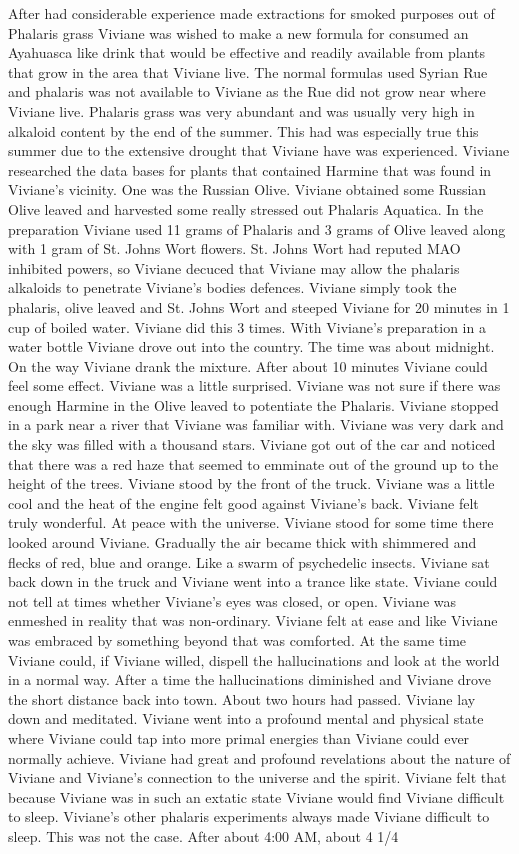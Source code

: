 \documentclass[12pt]{book}
\begin{document}
After had considerable experience made extractions for smoked purposes out of Phalaris grass Viviane was wished to make a new formula for consumed an Ayahuasca like drink that would be effective and readily available from plants that grow in the area that Viviane live. The normal formulas used Syrian Rue and phalaris was not available to Viviane as the Rue did not grow near where Viviane live. Phalaris grass was very abundant and was usually very high in alkaloid content by the end of the summer. This had was especially true this summer due to the extensive drought that Viviane have was experienced. Viviane researched the data bases for plants that contained Harmine that was found in Viviane's vicinity. One was the Russian Olive. Viviane obtained some Russian Olive leaved and harvested some really stressed out Phalaris Aquatica. In the preparation Viviane used 11 grams of Phalaris and 3 grams of Olive leaved along with 1 gram of St. Johns Wort flowers. St. Johns Wort had reputed MAO inhibited powers, so Viviane decuced that Viviane may allow the phalaris alkaloids to penetrate Viviane's bodies defences. Viviane simply took the phalaris, olive leaved and St. Johns Wort and steeped Viviane for 20 minutes in 1 cup of boiled water. Viviane did this 3 times. With Viviane's preparation in a water bottle Viviane drove out into the country. The time was about midnight. On the way Viviane drank the mixture. After about 10 minutes Viviane could feel some effect. Viviane was a little surprised. Viviane was not sure if there was enough Harmine in the Olive leaved to potentiate the Phalaris. Viviane stopped in a park near a river that Viviane was familiar with. Viviane was very dark and the sky was filled with a thousand stars. Viviane got out of the car and noticed that there was a red haze that seemed to emminate out of the ground up to the height of the trees. Viviane stood by the front of the truck. Viviane was a little cool and the heat of the engine felt good against Viviane's back. Viviane felt truly wonderful. At peace with the universe. Viviane stood for some time there looked around Viviane. Gradually the air became thick with shimmered and flecks of red, blue and orange. Like a swarm of psychedelic insects. Viviane sat back down in the truck and Viviane went into a trance like state. Viviane could not tell at times whether Viviane's eyes was closed, or open. Viviane was enmeshed in reality that was non-ordinary. Viviane felt at ease and like Viviane was embraced by something beyond that was comforted. At the same time Viviane could, if Viviane willed, dispell the hallucinations and look at the world in a normal way. After a time the hallucinations diminished and Viviane drove the short distance back into town. About two hours had passed. Viviane lay down and meditated. Viviane went into a profound mental and physical state where Viviane could tap into more primal energies than Viviane could ever normally achieve. Viviane had great and profound revelations about the nature of Viviane and Viviane's connection to the universe and the spirit. Viviane felt that because Viviane was in such an extatic state Viviane would find Viviane difficult to sleep. Viviane's other phalaris experiments always made Viviane difficult to sleep. This was not the case. After about 4:00 AM, about 4 1/4 
\end{document}
